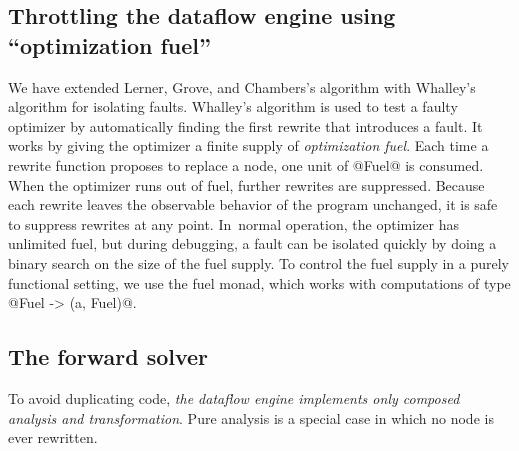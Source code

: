 \documentclass[blockstyle,preprint,natbib,nocopyrightspace]{sigplanconf}
\newcommand{\authornote}[1]{{\em #1}}
\def\authornote#1{\unskip\relax}
\newcommand{\simon}[1]{\authornote{SLPJ: #1}}
\newcommand{\norman}[1]{\authornote{NR: #1}}
\let\remark\norman
\def\finalremark#1{\relax}
\newcommand\seclabel[1]{\label{sec:#1}}
\begin{document}

\subsection{Throttling the dataflow engine using ``optimization
  fuel''}

\seclabel{vpoiso}

We have extended Lerner, Grove, and Chambers's algorithm with
Whalley's \citeyearpar{whalley:isolation} algorithm for isolating
faults.
Whalley's algorithm is used to test a faulty optimizer by automatically
finding the first rewrite that introduces a fault.
It works by giving the optimizer a finite supply of \emph{optimization
fuel}.
Each time a rewrite function proposes to replace a node, one unit of @Fuel@ is
consumed.
When the optimizer runs out of fuel, further rewrites are suppressed.
Because each rewrite leaves the observable behavior of the
program unchanged, it is safe to suppress rewrites at
any point.
In~normal operation, the optimizer has unlimited fuel, but during
debugging, a fault can be isolated quickly by doing a binary search on
the size of the fuel supply.
To control the fuel supply in a purely functional setting, we use
the fuel monad, which works with
computations of type @Fuel -> (a, Fuel)@.


\subsection{The forward solver}

\seclabel{forward-solver}

\simon{What does the reader gain from here on?}

To avoid duplicating code,
\emph{the dataflow engine implements only composed
analysis and transformation}.
Pure analysis is a special case in which no node is
ever rewritten.


\finalremark{How and where do we say what's new over
\citet{ramsey-dias:applicative-flow-graph}?}
\end{document}
